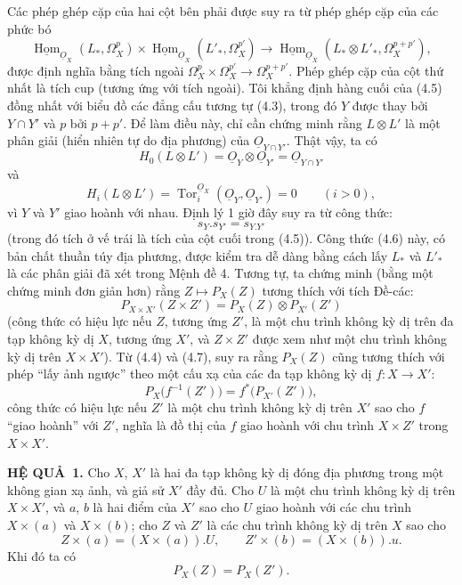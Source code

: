 \documentclass[11pt,twoside,openany]{book}
\numberwithin{equation}{section}
\newcommand{\src}[1]{%
  \phantomsection\hypertarget{src:\fgasourceid:#1}{}%
  \marginpar{\raggedleft\footnotesize\sffamily #1}%
}
\newcommand{\fgasourceid}{unset}
\newcommand{\Osh}{\underline{O}}
\newcommand{\Homsh}{\underline{\operatorname{Hom}}}
\newcommand{\result}[2]{\par\medskip\noindent\textbf{#1\if\relax\detokenize{#2}\relax\else\ #2\fi.}\quad}
\begin{document}
\src{180}
Các phép ghép cặp của hai cột bên phải được suy ra từ phép ghép cặp của
các phức bó
\[
\Homsh_{\Osh_X}(L_{*},\Omega_X^{p})
\times\Homsh_{\Osh_X}(L'_{*},\Omega_X^{p'})
\longrightarrow
\Homsh_{\Osh_X}(L_{*}\otimes L'_{*},\Omega_X^{p+p'}),
\]
được định nghĩa bằng tích ngoài
$\Omega_X^{p}\times\Omega_X^{p'}\longrightarrow\Omega_X^{p+p'}$.
Phép ghép cặp của cột thứ nhất là tích cup (tương ứng với tích
ngoài). Tôi khẳng định hàng cuối của (4.5) đồng nhất với biểu đồ
các đẳng cấu tương tự (4.3), trong đó $Y$ được thay bởi $Y\cap Y'$ và $p$ bởi
$p+p'$. Để làm điều này, chỉ cần chứng minh rằng $L\otimes L'$ là một phân giải
(hiển nhiên tự do địa phương) của $\Osh_{Y\cap Y'}$. Thật vậy, ta có
\[
  H_0(L\otimes L')=\Osh_Y\otimes\Osh_{Y'}=\Osh_{Y\cap Y'}
\]
và
\[
  H_i(L\otimes L')=\operatorname{Tor}_{i}^{\Osh_X}(\Osh_Y,\Osh_{Y'})=0
  \qquad(i>0),
\]
vì $Y$ và $Y'$ giao hoành với nhau. Định lý 1 giờ đây suy ra
từ công thức:
\begin{equation}\tag{4.6}
  s_Y.s_{Y'}=s_{Y.Y'}
\end{equation}
(trong đó tích ở vế trái là tích của cột cuối trong (4.5)).
Công thức (4.6) này, có bản chất thuần túy địa phương, được kiểm tra dễ dàng
bằng cách lấy $L_{*}$ và $L'_{*}$ là các phân giải đã xét trong Mệnh đề
4. Tương tự, ta chứng minh (bằng một chứng minh đơn giản hơn) rằng
$Z\longmapsto P_X(Z)$ tương thích với tích Đề-các:
\begin{equation}\tag{4.7}
  P_{X\times X'}(Z\times Z')=P_X(Z)\otimes P_{X'}(Z')
\end{equation}
(công thức có hiệu lực nếu $Z$, tương ứng $Z'$, là một chu trình không kỳ dị trên đa tạp
không kỳ dị $X$, tương ứng $X'$, và $Z\times Z'$ được xem như một chu trình không
kỳ dị trên $X\times X'$). Từ (4.4) và (4.7), suy ra rằng $P_X(Z)$ cũng
tương thích với phép “lấy ảnh ngược” theo một cấu xạ của các đa tạp không
kỳ dị $f:X\longrightarrow X'$:
\begin{equation}\tag{4.8}
  P_X\bigl(f^{-1}(Z')\bigr)=f^{*}\bigl(P_{X'}(Z')\bigr),
\end{equation}
công thức có hiệu lực nếu $Z'$ là một chu trình không kỳ dị trên $X'$ sao cho $f$
“giao hoành” với $Z'$, nghĩa là đồ thị của $f$ giao hoành với chu trình
$X\times Z'$ trong $X\times X'$.


\src{181}
\result{HỆ QUẢ}{1} Cho $X$, $X'$ là hai đa tạp không kỳ dị
đóng địa phương trong một không gian xạ ảnh, và giả sử $X'$ đầy đủ. Cho $U$
là một chu trình không kỳ dị trên $X\times X'$, và $a$, $b$ là hai điểm của $X'$ sao cho
$U$ giao hoành với các chu trình $X\times(a)$ và $X\times(b)$; cho $Z$
và $Z'$ là các chu trình không kỳ dị trên $X$ sao cho
\[
  Z\times(a)=(X\times(a)).U,
  \qquad
  Z'\times(b)=(X\times(b)).u.
\]
Khi đó ta có
\[
  P_X(Z)=P_X(Z').
\]
\end{document}
